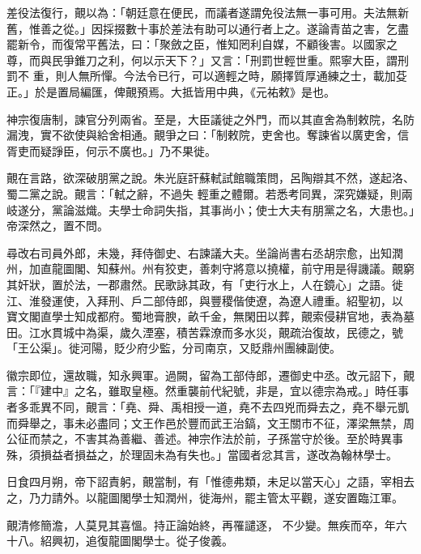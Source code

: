 \begin{pinyinscope}
 差役法復行，覿以為：「朝廷意在便民，而議者遂謂免役法無一事可用。夫法無新舊，惟善之從。」因採掇數十事於差法有助可以通行者上之。遂論青苗之害，乞盡罷新令，而復常平舊法，曰：「聚斂之臣，惟知罔利自媒，不顧後害。以國家之尊，而與民爭錐刀之利，何以示天下？」又言：「刑罰世輕世重。熙寧大臣，謂刑罰不
 重，則人無所憚。今法令已行，可以適輕之時，願擇質厚通練之士，載加芟正。」於是置局編匯，俾覿預焉。大抵皆用中典，《元祐敕》是也。



 神宗復唐制，諫官分列兩省。至是，大臣議徙之外門，而以其直舍為制敕院，名防漏洩，實不欲使與給舍相通。覿爭之曰：「制敕院，吏舍也。奪諫省以廣吏舍，信胥吏而疑諍臣，何示不廣也。」乃不果徙。



 覿在言路，欲深破朋黨之說。朱光庭訐蘇軾試館職策問，呂陶辯其不然，遂起洛、蜀二黨之說。覿言：「軾之辭，不過失
 輕重之體爾。若悉考同異，深究嫌疑，則兩岐遂分，黨論滋熾。夫學士命詞失指，其事尚小；使士大夫有朋黨之名，大患也。」帝深然之，置不問。



 尋改右司員外郎，未幾，拜侍御史、右諫議大夫。坐論尚書右丞胡宗愈，出知潤州，加直龍圖閣、知蘇州。州有狡吏，善刺守將意以撓權，前守用是得譏議。覿窮其奸狀，置於法，一郡肅然。民歌詠其政，有「吏行水上，人在鏡心」之語。徙江、淮發運使，入拜刑、戶二部侍郎，與豐稷偕使遼，為遼人禮重。紹聖初，以
 寶文閣直學士知成都府。蜀地膏腴，畝千金，無閑田以葬，覿索侵耕官地，表為墓田。江水貫城中為渠，歲久湮塞，積苦霖潦而多水災，覿疏治復故，民德之，號「王公渠」。徙河陽，貶少府少監，分司南京，又貶鼎州團練副使。



 徽宗即位，還故職，知永興軍。過闕，留為工部侍郎，遷御史中丞。改元詔下，覿言：「『建中』之名，雖取皇極。然重襲前代紀號，非是，宜以德宗為戒。」時任事者多乖異不同，覿言：「堯、舜、禹相授一道，堯不去四兇而舜去之，堯不舉元凱
 而舜舉之，事未必盡同；文王作邑於豐而武王治鎬，文王關市不征，澤梁無禁，周公征而禁之，不害其為善繼、善述。神宗作法於前，子孫當守於後。至於時異事殊，須損益者損益之，於理固未為有失也。」當國者忿其言，遂改為翰林學士。



 日食四月朔，帝下詔責躬，覿當制，有「惟德弗類，未足以當天心」之語，宰相去之，乃力請外。以龍圖閣學士知潤州，徙海州，罷主管太平觀，遂安置臨江軍。



 覿清修簡澹，人莫見其喜慍。持正論始終，再罹譴逐，
 不少變。無疾而卒，年六十八。紹興初，追復龍圖閣學士。從子俊義。




\end{pinyinscope}
